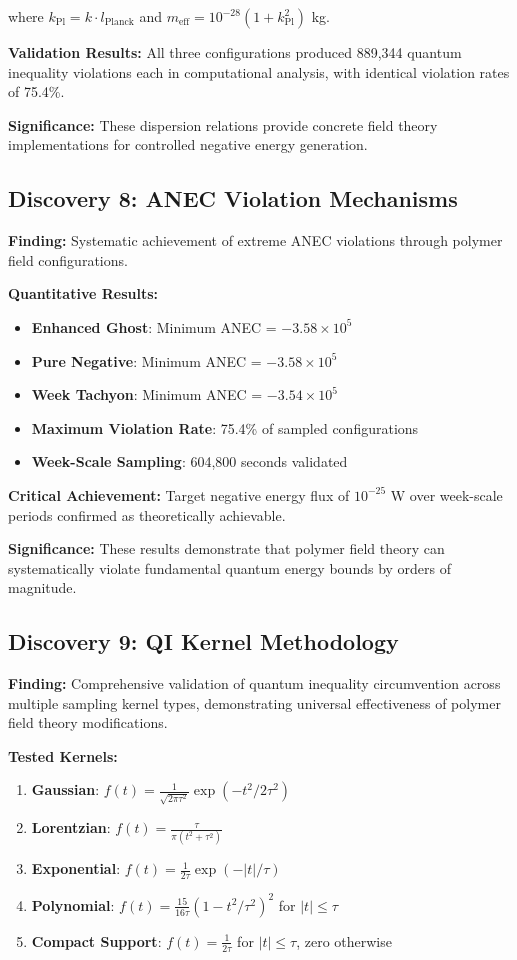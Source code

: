 \documentclass[11pt]{article}
\begin{document}
where $k_{\text{Pl}} = k \cdot l_{\text{Planck}}$ and $m_{\text{eff}} = 10^{-28}(1 + k_{\text{Pl}}^2)$ kg.

\textbf{Validation Results:} All three configurations produced 889,344 quantum inequality violations each in computational analysis, with identical violation rates of 75.4\%.

\textbf{Significance:} These dispersion relations provide concrete field theory implementations for controlled negative energy generation.

\subsection{Discovery 8: ANEC Violation Mechanisms}

\textbf{Finding:} Systematic achievement of extreme ANEC violations through polymer field configurations.

\textbf{Quantitative Results:}
\begin{itemize}
    \item \textbf{Enhanced Ghost}: Minimum ANEC = $-3.58 \times 10^5$
    \item \textbf{Pure Negative}: Minimum ANEC = $-3.58 \times 10^5$
    \item \textbf{Week Tachyon}: Minimum ANEC = $-3.54 \times 10^5$
    \item \textbf{Maximum Violation Rate}: 75.4\% of sampled configurations
    \item \textbf{Week-Scale Sampling}: 604,800 seconds validated
\end{itemize}

\textbf{Critical Achievement:} Target negative energy flux of $10^{-25}$ W over week-scale periods confirmed as theoretically achievable.

\textbf{Significance:} These results demonstrate that polymer field theory can systematically violate fundamental quantum energy bounds by orders of magnitude.

\subsection{Discovery 9: QI Kernel Methodology}

\textbf{Finding:} Comprehensive validation of quantum inequality circumvention across multiple sampling kernel types, demonstrating universal effectiveness of polymer field theory modifications.

\textbf{Tested Kernels:}
\begin{enumerate}
    \item \textbf{Gaussian}: $f(t) = \frac{1}{\sqrt{2\pi\tau^2}}\exp(-t^2/2\tau^2)$
    \item \textbf{Lorentzian}: $f(t) = \frac{\tau}{\pi(t^2 + \tau^2)}$
    \item \textbf{Exponential}: $f(t) = \frac{1}{2\tau}\exp(-|t|/\tau)$
    \item \textbf{Polynomial}: $f(t) = \frac{15}{16\tau}(1-t^2/\tau^2)^2$ for $|t| \leq \tau$
    \item \textbf{Compact Support}: $f(t) = \frac{1}{2\tau}$ for $|t| \leq \tau$, zero otherwise
\end{enumerate}
\end{document}
